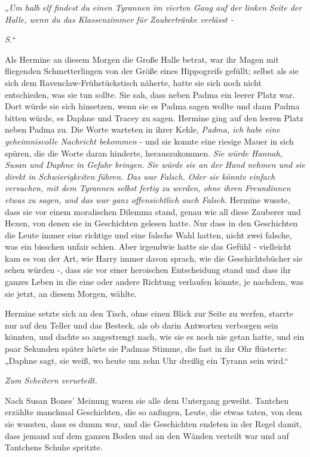{\emph{„Um halb elf findest du einen Tyrannen im vierten Gang auf der linken Seite der Halle, wenn du das Klassenzimmer für Zaubertränke verlässt -}

\hfill\break

\emph{S.“}

Als Hermine an diesem Morgen die Große Halle betrat, war ihr Magen mit fliegenden Schmetterlingen von der Größe eines Hippogreifs gefüllt; selbst als sie sich dem Ravenclaw-Frühstückstisch näherte, hatte sie sich noch nicht entschieden, was sie tun sollte. Sie sah, dass neben Padma ein leerer Platz war. Dort würde sie sich hinsetzen, wenn sie es Padma sagen wollte und dann Padma bitten würde, es Daphne und Tracey zu sagen. Hermine ging auf den leeren Platz neben Padma zu. Die Worte warteten in ihrer Kehle, \emph{Padma, ich habe eine geheimnisvolle Nachricht bekommen} - und sie konnte eine riesige Mauer in sich spüren, die die Worte daran hinderte, herauszukommen. \emph{Sie würde Hannah, Susan und Daphne in Gefahr bringen. Sie würde sie an der Hand nehmen und sie direkt in Schwierigkeiten führen. Das war Falsch. Oder sie könnte einfach versuchen, mit dem Tyrannen selbst fertig zu werden, ohne ihren Freundinnen etwas zu sagen, und das war ganz offensichtlich auch Falsch.} Hermine wusste, dass sie vor einem moralischen Dilemma stand, genau wie all diese Zauberer und Hexen, von denen sie in Geschichten gelesen hatte. Nur dass in den Geschichten die Leute immer eine richtige und eine falsche Wahl hatten, nicht zwei falsche, was ein bisschen unfair schien. Aber irgendwie hatte sie das Gefühl - vielleicht kam es von der Art, wie Harry immer davon sprach, wie die Geschichtsbücher sie sehen würden -, dass sie vor einer heroischen Entscheidung stand und dass ihr ganzes Leben in die eine oder andere Richtung verlaufen könnte, je nachdem, was sie jetzt, an diesem Morgen, wählte.

Hermine setzte sich an den Tisch, ohne einen Blick zur Seite zu werfen, starrte nur auf den Teller und das Besteck, als ob darin Antworten verborgen sein könnten, und dachte so angestrengt nach, wie sie es noch nie getan hatte, und ein paar Sekunden später hörte sie Padmas Stimme, die fast in ihr Ohr flüsterte:\\ „Daphne sagt, sie weiß, wo heute um zehn Uhr dreißig ein Tyrann sein wird.“

\emph{Zum Scheitern verurteilt.}

Nach Susan Bones' Meinung waren sie alle dem Untergang geweiht. Tantchen erzählte manchmal Geschichten, die so anfingen, Leute, die etwas taten, von dem sie wussten, dass es dumm war, und die Geschichten endeten in der Regel damit, dass jemand auf dem ganzen Boden und an den Wänden verteilt war und auf Tantchens Schuhe spritzte.

}
